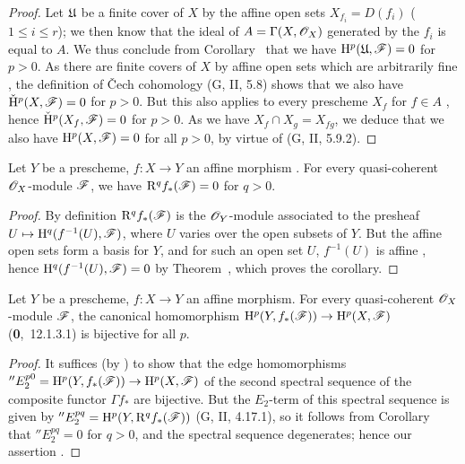 \begin{proof}
\label{proof-3.1.3.1}
Let $\mathfrak{U}$ be a finite cover of $X$ by the affine open sets $X_{f_i}=D(f_i)$ ($1\leq i\leq r$); we then know that the ideal of $A=\Gamma(X,\mathscr{O}_X)$ generated by the $f_i$ is equal to $A$.
We thus conclude from Corollary~ that we have $\mathrm{H}^p(\mathfrak{U},\mathscr{F})=0$ for $p>0$.
As there are finite covers of $X$ by affine open sets which are arbitrarily fine , the definition of \v Cech cohomology (G, II, 5.8) shows that we also have $\check{\mathrm{H}}^p(X,\mathscr{F})=0$ for $p>0$.
But this also applies to every prescheme $X_f$ for $f\in A$ , hence $\check{\mathrm{H}}^p(X_f,\mathscr{F})=0$ for $p>0$.
As we have $X_f\cap X_g=X_{fg}$, we deduce that we also have $\mathrm{H}^p(X,\mathscr{F})=0$ for all $p>0$, by virtue of (G, II, 5.9.2).
\end{proof}

\begin{cor}[1.3.2]
\label{3.1.3.2}
Let $Y$ be a prescheme, $f:X\to Y$ an affine morphism .
For every quasi-coherent $\mathscr{O}_X$-module $\mathscr{F}$, we have $\mathrm{R}^q f_*(\mathscr{F})=0$ for $q>0$.
\end{cor}

\begin{proof}
\label{proof-3.1.3.2}
By definition $\mathrm{R}^q f_*(\mathscr{F})$ is the $\mathscr{O}_Y$-module associated to the presheaf $U\mapsto\HH^q(f^{-1}(U),\sh{F})$, where $U$ varies over the open subsets of $Y$.
But the affine open sets form a basis for $Y$, and for such an open set $U$, $f^{-1}(U)$ is affine , hence $\mathrm{H}^q(f^{-1}(U),\mathscr{F})=0$ by Theorem~, which proves the corollary.
\end{proof}

\begin{cor}[1.3.3]
\label{3.1.3.3}
Let $Y$ be a prescheme, $f:X\to Y$ an affine morphism.
For every quasi-coherent $\mathscr{O}_X$-module $\mathscr{F}$, the canonical homomorphism $\HH^p(Y,f_*(\sh{F}))\to\HH^p(X,\sh{F})$ (\textbf{0},~12.1.3.1) is bijective for all $p$.
\end{cor}

\begin{proof}
\label{proof-3.1.3.3}
It suffices (by ) to show that the edge homomorphisms $''E_2^{p0}=\HH^p(Y,f_*(\sh{F}))\to\HH^p(X,\sh{F})$ of the second spectral sequence of the composite functor $\Gamma f_*$ are bijective.
But the $E_2$-term of this spectral sequence is given by $''E_2^{pq}=\mathrm{H}^p(Y,\mathrm{R}^q f_*(\mathscr{F}))$ (G, II, 4.17.1), so it follows from Corollary~ that $''E_2^{pq}=0$ for $q>0$, and the spectral sequence degenerates; hence our assertion .
\end{proof}

